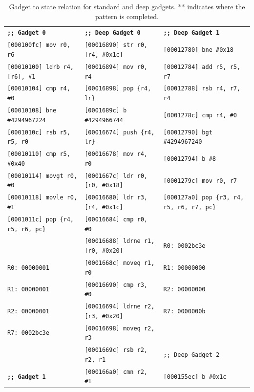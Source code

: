 \begin{table}
\caption{Gadget to state relation for standard and deep gadgets. ** indicates where the pattern is completed. }\label{tbl:gadget}
\begin{center}
{\scriptsize
\begin{tabular}{|l|l|l|} \hline
\textbf{\texttt{;; Gadget 0}} 			& \textbf{\texttt{;; Deep Gadget 0}}				& \textbf{\texttt{;; Deep Gadget 1}} \\ 
\texttt{[000100fc]  mov r0, r6} 	& \texttt{[00016890]  str r0, [r4, \#0x1c]}		& \texttt{[00012780]  bne \#0x18} \\
\texttt{[00010100]  ldrb r4, [r6], \#1} & \texttt{[00016894]  mov r0, r4}		& \texttt{[00012784]  add r5, r5, r7} \\
\texttt{[00010104]  cmp r4, \#0}	& \texttt{[00016898]  pop \{r4, lr\}}			& \texttt{[00012788]  rsb r4, r7, r4} \\
\texttt{[00010108]  bne \#4294967224} & \texttt{[0001689c]  b \#4294966744}	& \texttt{[0001278c]  cmp r4, \#0} \\
\texttt{[0001010c]  rsb r5, r5, r0}	& \texttt{[00016674]  push \{r4, lr\}}		& \texttt{[00012790]  bgt \#4294967240} \\
\texttt{[00010110]  cmp r5, \#0x40} & \texttt{[00016678]  mov r4, r0}		& \texttt{[00012794]  b \#8} \\
\texttt{[00010114]  movgt r0, \#0}	& \texttt{[0001667c]  ldr r0, [r0, \#0x18]}	& \texttt{[0001279c]  mov r0, r7} \\
\texttt{[00010118]  movle r0, \#1}	& \texttt{[00016680]  ldr r3, [r4, \#0x1c]}	& \texttt{[000127a0]  pop \{r3, r4, r5, r6, r7, pc\}} \\
\texttt{[0001011c]  pop \{r4, r5, r6, pc\}} & \texttt{[00016684]  cmp r0, \#0}		& \\
 					& \texttt{[00016688]  ldrne r1, [r0, \#0x20]}	& \texttt{R0: 0002bc3e} \\
\texttt{R0: 00000001} 			& \texttt{[0001668c]  moveq r1, r0}		& \texttt{R1: 00000000} \\
\texttt{R1: 00000001} 			& \texttt{[00016690]  cmp r3, \#0}		& \texttt{R2: 00000000} \\
\texttt{R2: 00000001} 			& \texttt{[00016694]  ldrne r2, [r3, \#0x20]}	& \texttt{R7: 0000000b} \\
\texttt{R7: 0002bc3e} 			& \texttt{[00016698]  moveq r2, r3}		& \\
 					& \texttt{[0001669c]  rsb r2, r2, r1}		& \texttt{;; Deep Gadget 2} \\
\textbf{\texttt{;; Gadget 1}} 		& \texttt{[000166a0]  cmn r2, \#1}		& \texttt{[000155ec]  b \#0x1c} \\

\end{tabular}}
\end{center}
\end{table}
